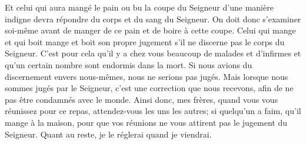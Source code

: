 Et celui qui aura mangé le pain ou bu la coupe du Seigneur d’une manière indigne
	devra répondre du corps et du sang du Seigneur.
On doit donc s’examiner soi-même
	avant de manger de ce pain et de boire à cette coupe.
Celui qui mange et qui boit mange et boit son propre jugement
	s’il ne discerne pas le corps du Seigneur.
C’est pour cela qu’il y a chez vous beaucoup de malades et d’infirmes
	et qu’un certain nombre sont endormis dans la mort.
Si nous avions du discernement envers nous-mêmes,
	nous ne serions pas jugés.
Mais lorsque nous sommes jugés par le Seigneur,
	c’est une correction que nous recevons,
	afin de ne pas être condamnés avec le monde.
Ainsi donc, mes frères, quand vous vous réunissez pour ce repas,
	attendez-vous les uns les autres;
	si quelqu’un a faim, qu’il mange à la maison,
	pour que vos réunions ne vous attirent pas le jugement du Seigneur.
Quant au reste, je le réglerai quand je viendrai.
